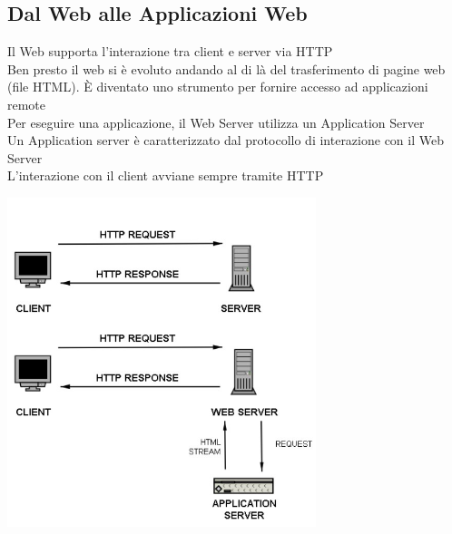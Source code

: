 \subsection{Dal Web alle Applicazioni Web}
Il Web supporta l'interazione tra client e server via HTTP
\\Ben presto il web si è evoluto andando al di là del trasferimento di pagine web (file HTML). \`E diventato uno strumento per fornire accesso ad applicazioni remote
\\Per eseguire una applicazione, il Web Server utilizza un Application Server
\\Un Application server è caratterizzato dal protocollo di interazione con il Web Server
\\L'interazione con il client avviane sempre tramite HTTP 
\begin{center}
    \includegraphics[width=0.675\textwidth]{img/appWeb1.jpg}
\end{center}

